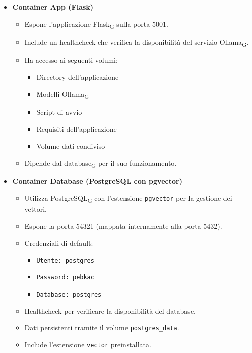 \begin{itemize}
    \item \textbf{Container App (Flask)}
    \begin{itemize}
        \item Espone l'applicazione Flask\textsubscript{G} sulla porta 5001.
        \item Include un healthcheck che verifica la disponibilità del servizio Ollama\textsubscript{G}.
        \item Ha accesso ai seguenti volumi:
        \begin{itemize}
            \item Directory dell'applicazione
            \item Modelli Ollama\textsubscript{G}
            \item Script di avvio
            \item Requisiti dell'applicazione
            \item Volume dati condiviso
        \end{itemize}
        \item Dipende dal database\textsubscript{G} per il suo funzionamento.
    \end{itemize}

    \item \textbf{Container Database (PostgreSQL con pgvector)}
    \begin{itemize}
        \item Utilizza PostgreSQL\textsubscript{G} con l'estensione \texttt{pgvector} per la gestione dei vettori.
        \item Espone la porta 54321 (mappata internamente alla porta 5432).
        \item Credenziali di default:
        \begin{itemize}
            \item \texttt{Utente: postgres}
            \item \texttt{Password: pebkac}
            \item \texttt{Database: postgres}
        \end{itemize}
        \item Healthcheck per verificare la disponibilità del database.
        \item Dati persistenti tramite il volume \texttt{postgres\_data}.
        \item Include l'estensione \texttt{vector} preinstallata.
    \end{itemize}


\end{itemize}
